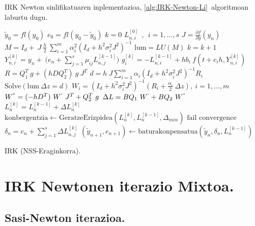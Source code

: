 \begin{enumerate}
\end{enumerate}


IRK Newton sinlifikatuaren inplementazioa, \ref{alg:IRK-Newton-Li}~algoritmoan laburtu dugu. 

\begin{algorithm}[h!]
 \BlankLine
  $\tilde{y}_0=fl(y_0)$\;
  $e_0=fl(y_0-\tilde{y}_0)$\;
  {
   \BlankLine
   $k=0$\;
     $L_{n,i}^{[0]} \ \ , \ \ i=1,\dots,s $\;
   \BlankLine
   $J=\frac{\partial f}{\partial y}(y_n) $\; 
   \BlankLine
   $ M=I_d+ \ J \ \frac{h}{2}\ \sum\limits_{i=1}^{m} \alpha_i^2 (I_d+h^2 \sigma_i^2 J^2)^{-1} $\;
   $ \mathrm{lum}=LU(M)$\;
   \BlankLine  
   {
    \BlankLine 
    $k=k+1$\;
    $Y_{n,i}^{[k]}=y_{n} + \ \big(e_n+\sum\limits_{j=1}^{s} \mu_{ij} L_{n,j}^{[k-1]}\big)  $\;  
    \BlankLine
    $g_i^{[k]}= -L_{n,i}^{[k-1]}+ hb_i \ f(t+c_ih, Y_{n,i}^{[k]}) $\;
    \BlankLine
    $R=Q_1^T \ g  + (h D Q_2^T) \ g \ J^T $\;
    $d=h \ J \sum\limits_{i=1}^{m}\alpha_i (I_d+h^2\sigma_i^2J^2)^{-1}R_i$\;
    $\text{Solve}(\mathrm{lum} \ \Delta z = d)$\;
    \BlankLine 
    $W_i=(I_d+h^2\sigma_i^2J^2)^{-1} (R_i+\frac{\alpha_i}{2} \ \Delta z), \ i=1,\dots,m$\;
    \BlankLine
    $W^{``}= (-hD^T) \ W^{`} \ J^T+Q_2^T \ g$\;
    \BlankLine
    $\Delta L =B Q_1 \ W^{`}+B Q_2 \ W^{``} $\;
    $L_n^{[k]}=L_n^{[k-1]}+\Delta L_n^{[k]}$\;
    $\text{konbergentzia} \leftarrow \text{GeratzeErizpidea}(L_n^{[k]},L_n^{[k-1]},\Delta_{min}) $\;
   }
 \BlankLine
   {
    {$\text{fail convergence}$\;}
   }
   $\delta_{n}={e}_{n} + \sum\limits_{j=1}^{s}\Delta L_{n,j}^{[k]}$\;
   $(\tilde y_{n+1}, e_{n+1})\leftarrow \text{baturakonpensatua}(\tilde y_{n},\delta_{n},L_{n}^{[k-1]})$\;
 }
 \caption{IRK (NSS-Eraginkorra).}
 \label{alg:IRK-Newton-Li}
\end{algorithm}


\clearpage


\section{IRK Newtonen iterazio Mixtoa.}
\label{sec:7.6}

\subsection{Sasi-Newton iterazioa.}


